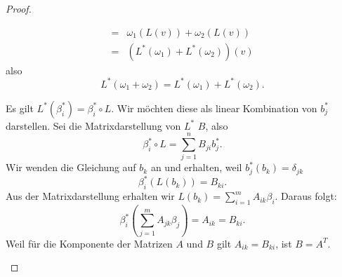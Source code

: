 \begin{proof}
\begin{parts}
\begin{align*}
	=&\omega_1(L(v))+\omega_2(L(v))\\
	=&(L^*(\omega_1)+L^*(\omega_2))(v)
	\end{align*}
	also
	\[
		L^*(\omega_1+\omega_2)=L^*(\omega_1)+L^*(\omega_2)
	.\] 
\item Es gilt $L^*(\beta_i^*)=\beta_i^*\circ L$. Wir möchten diese als linear Kombination von $b_j^*$ darstellen. Sei die Matrixdarstellung von $L^*$ $B$, also
	\[
		\beta_i^*\circ L=\sum_{j=1}^n B_{ji}b_j^*
	.\]
	Wir wenden die Gleichung auf $b_k$ an und erhalten, weil $b_j^*(b_k)=\delta_{jk}$ 
	\[
		\beta_i^*(L(b_k))=B_{ki}
	.\] 
	Aus der Matrixdarstellung erhalten wir $L(b_k)=\sum_{i=1}^m A_{ik}\beta_i$. Daraus folgt:
\[
	\beta_i^*\left( \sum_{j=1}^m A_{jk}\beta_j \right) =A_{ik}=B_{ki}
.\] 
Weil f\"{u}r die Komponente der Matrizen $A$ und $B$ gilt $A_{ik}=B_{ki}$, ist $B=A^T$.\qedhere
	\end{parts}
\end{proof}
